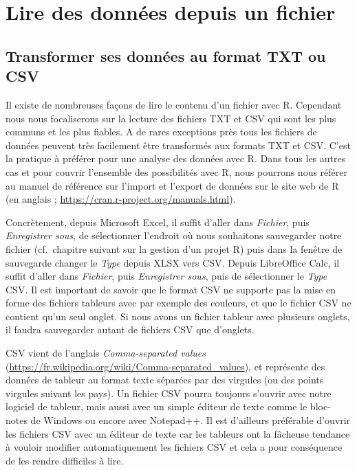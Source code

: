 \documentclass[twoside,symmetric]{book}
\begin{document}
\minitoc

\hypertarget{l016read}{%
\section{Lire des données depuis un fichier}\label{l016read}}

\hypertarget{l016transfo}{%
\subsection{Transformer ses données au format TXT ou CSV}\label{l016transfo}}

Il existe de nombreuses façons de lire le contenu d'un fichier avec R. Cependant nous nous focaliserons sur la lecture des fichiers TXT et CSV qui sont les plus communs et les plus fiables. A de rares exceptions près tous les fichiers de données peuvent très facilement être transformés aux formats TXT et CSV. C'est la pratique à préférer pour une analyse des données avec R. Dans tous les autres cas et pour couvrir l'ensemble des possibilités avec R, nous pourrons nous référer au manuel de référence sur l'import et l'export de données sur le site web de R (en anglais ; \url{https://cran.r-project.org/manuals.html}).

Concrètement, depuis Microsoft Excel, il suffit d'aller dans \emph{Fichier}, puis \emph{Enregistrer sous}, de sélectionner l'endroit où nous souhaitons sauvegarder notre fichier (cf.~chapitre suivant sur la gestion d'un projet R) puis dans la fenêtre de sauvegarde changer le \emph{Type} depuis XLSX vers CSV. Depuis LibreOffice Calc, il suffit d'aller dans \emph{Fichier}, puis \emph{Enregistrer sous}, puis de sélectionner le \emph{Type} CSV. Il est important de savoir que le format CSV ne supporte pas la mise en forme des fichiers tableurs avec par exemple des couleurs, et que le fichier CSV ne contient qu'un seul onglet. Si nous avons un fichier tableur avec plusieurs onglets, il faudra sauvegarder autant de fichiers CSV que d'onglets.

CSV vient de l'anglais \emph{Comma-separated values} (\url{https://fr.wikipedia.org/wiki/Comma-separated_values}), et représente des données de tableur au format texte séparées par des virgules (ou des points virgules suivant les pays). Un fichier CSV pourra toujours s'ouvrir avec notre logiciel de tableur, mais aussi avec un simple éditeur de texte comme le bloc-notes de Windows ou encore avec Notepad++. Il est d'ailleurs préférable d'ouvrir les fichiers CSV avec un éditeur de texte car les tableurs ont la fâcheuse tendance à vouloir modifier automatiquement les fichiers CSV et cela a pour conséquence de les rendre difficiles à lire.
\end{document}
